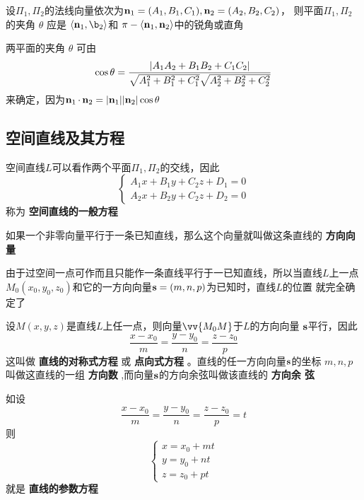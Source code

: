 \documentclass[11pt]{article}
\begin{document}
设\(\Pi_1,\Pi_2\)的法线向量依次为\(\operatorname{\textbf{n}}_1=(A_1,B_1,C_1),\operatorname{\textbf{n}}_2=(A_2,B_2,C_2)\)，
则平面\(\Pi_1,\Pi_2\)的夹角 \(\theta\) 应是 \(\la\bn_1,\b_2\ra\)和
\(\pi-\langle\operatorname{\textbf{n}}_1,\operatorname{\textbf{n}}_2\rangle\)中的锐角或直角

两平面的夹角 \(\theta\) 可由
\begin{equation*}
\cos\theta=
\frac{\abs{A_1A_2+B_1B_2+C_1C_2}}{\sqrt{A_1^2+B_1^2+C_1^2}\sqrt{A_2^2+B_2^2+C_2^2}}
\end{equation*}
来确定，因为\(\bn_1\cdot\bn_2=\abs{\bn_1}\abs{\bn_2}\cos\theta\)
\subsection{空间直线及其方程}
\label{sec:orgef54f3a}
空间直线\(L\)可以看作两个平面\(\Pi_1,\Pi_2\)的交线，因此
\begin{equation*}
\begin{cases}
A_1x+B_1y+C_2z+D_1=0\\
A_2x+B_2y+C_2z+D_2=0
\end{cases}
\end{equation*}
称为 \textbf{空间直线的一般方程}

如果一个非零向量平行于一条已知直线，那么这个向量就叫做这条直线的 \textbf{方向向量}

由于过空间一点可作而且只能作一条直线平行于一已知直线，所以当直线\(L\)上一点
\(M_0(x_0,y_0,z_0)\)和它的一方向向量\(\operatorname{\textbf{s}}=(m,n,p)\)为已知时，直线\(L\)的位置
就完全确定了

设\(M(x,y,z)\)是直线\(L\)上任一点，则向量\(\vv{M_0M}\)于\(L\)的方向向量
\(\operatorname{\textbf{s}}\)平行，因此
\begin{equation*}
\frac{x-x_0}{m}=\frac{y-y_0}{n}=\frac{z-z_0}{p}
\end{equation*}
这叫做 \textbf{直线的对称式方程} 或 \textbf{点向式方程} 。直线的任一方向向量\(\operatorname{\textbf{s}}\)的坐标
\(m,n,p\)叫做这直线的一组 \textbf{方向数} ,而向量\(\operatorname{\textbf{s}}\)的方向余弦叫做该直线的 \textbf{方向余
弦}

如设
\begin{equation*}
\frac{x-x_0}{m}=\frac{y-y_0}{n}=\frac{z-z_0}{p}=t
\end{equation*}
则
\begin{equation*}
\begin{cases}
x=x_0+mt\\y=y_0+nt\\z=z_0+pt
\end{cases}
\end{equation*}
就是 \textbf{直线的参数方程}
\end{document}
